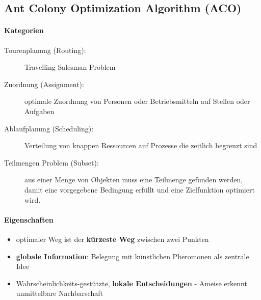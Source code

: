 \pagebreak

\subsection{Ant Colony Optimization Algorithm (ACO)}
\paragraph{Kategorien}
\begin{description}
	\item[Tourenplanung (Routing):] Travelling Salesman Problem
	\item[Zuordnung (Assignment):] optimale Zuordnung von Personen oder
		Betriebsmitteln auf Stellen oder Aufgaben
	\item[Ablaufplanung (Scheduling):] Verteilung von knappen Ressourcen auf
		Prozesse die zeitlich begrenzt sind
	\item[Teilmengen Problem (Subset):] aus einer Menge von Objekten muss eine
		Teilmenge gefunden werden, damit eine vorgegebene Bedingung erfüllt und
		eine Zielfunktion optimiert wird.
\end{description}

\paragraph{Eigenschaften}
\begin{itemize}
	\item optimaler Weg ist der \textbf{kürzeste Weg} zwischen zwei Punkten
	\item \textbf{globale Information}: Belegung mit künstlichen Pheromonen als zentrale Idee
	\item Wahrscheinlichkeits-gestützte, \textbf{lokale Entscheidungen} - Ameise erkennt unmittelbare Nachbarschaft
\end{itemize}

